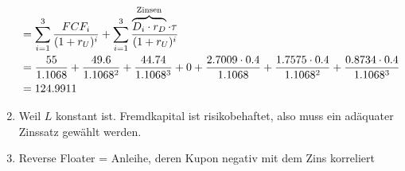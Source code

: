 \documentclass{article}
\begin{document}
\begin{enumerate}[label=(\alph*)]
\begin{align}
			&= \sum_{i=1}^3 \frac{FCF_i}{(1+r_U)^i} + \sum_{i=1}^3 \frac{\overbrace{D_i\cdot r_D}^{\text{Zinsen}}\cdot\tau}{(1+r_U)^i} \notag \\
			&= \frac{55}{1.1068} + \frac{49.6}{1.1068^2} + \frac{44.74}{1.1068^3} + 0 + \frac{2.7009\cdot 0.4}{1.1068} + \frac{1.7575\cdot 0.4}{1.1068^2} + \frac{0.8734\cdot 0.4}{1.1068^3} \notag \\
			&= 124.9911 \notag
		\end{align}
		\item Weil $L$ konstant ist. Fremdkapital ist risikobehaftet, also muss ein adäquater Zinssatz gewählt werden.
		\item Reverse Floater = Anleihe, deren Kupon negativ mit dem Zins korreliert
	\end{enumerate}
	
\end{document}
